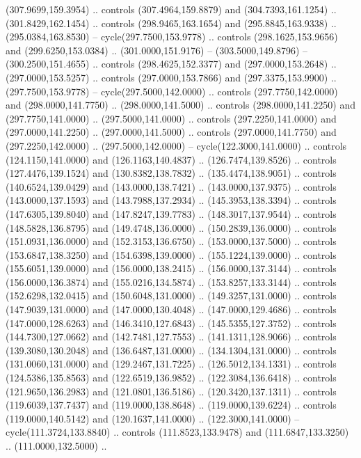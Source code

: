   (307.9699,159.3954) .. controls (307.4964,159.8879) and (304.7393,161.1254) ..
  (301.8429,162.1454) .. controls (298.9465,163.1654) and (295.8845,163.9338) ..
  (295.0384,163.8530) -- cycle(297.7500,153.9778) .. controls
  (298.1625,153.9656) and (299.6250,153.0384) .. (301.0000,151.9176) --
  (303.5000,149.8796) -- (300.2500,151.4655) .. controls (298.4625,152.3377) and
  (297.0000,153.2648) .. (297.0000,153.5257) .. controls (297.0000,153.7866) and
  (297.3375,153.9900) .. (297.7500,153.9778) -- cycle(297.5000,142.0000) ..
  controls (297.7750,142.0000) and (298.0000,141.7750) .. (298.0000,141.5000) ..
  controls (298.0000,141.2250) and (297.7750,141.0000) .. (297.5000,141.0000) ..
  controls (297.2250,141.0000) and (297.0000,141.2250) .. (297.0000,141.5000) ..
  controls (297.0000,141.7750) and (297.2250,142.0000) .. (297.5000,142.0000) --
  cycle(122.3000,141.0000) .. controls (124.1150,141.0000) and
  (126.1163,140.4837) .. (126.7474,139.8526) .. controls (127.4476,139.1524) and
  (130.8382,138.7832) .. (135.4474,138.9051) .. controls (140.6524,139.0429) and
  (143.0000,138.7421) .. (143.0000,137.9375) .. controls (143.0000,137.1593) and
  (143.7988,137.2934) .. (145.3953,138.3394) .. controls (147.6305,139.8040) and
  (147.8247,139.7783) .. (148.3017,137.9544) .. controls (148.5828,136.8795) and
  (149.4748,136.0000) .. (150.2839,136.0000) .. controls (151.0931,136.0000) and
  (152.3153,136.6750) .. (153.0000,137.5000) .. controls (153.6847,138.3250) and
  (154.6398,139.0000) .. (155.1224,139.0000) .. controls (155.6051,139.0000) and
  (156.0000,138.2415) .. (156.0000,137.3144) .. controls (156.0000,136.3874) and
  (155.0216,134.5874) .. (153.8257,133.3144) .. controls (152.6298,132.0415) and
  (150.6048,131.0000) .. (149.3257,131.0000) .. controls (147.9039,131.0000) and
  (147.0000,130.4048) .. (147.0000,129.4686) .. controls (147.0000,128.6263) and
  (146.3410,127.6843) .. (145.5355,127.3752) .. controls (144.7300,127.0662) and
  (142.7481,127.7553) .. (141.1311,128.9066) .. controls (139.3080,130.2048) and
  (136.6487,131.0000) .. (134.1304,131.0000) .. controls (131.0060,131.0000) and
  (129.2467,131.7225) .. (126.5012,134.1331) .. controls (124.5386,135.8563) and
  (122.6519,136.9852) .. (122.3084,136.6418) .. controls (121.9650,136.2983) and
  (121.0801,136.5186) .. (120.3420,137.1311) .. controls (119.6039,137.7437) and
  (119.0000,138.8648) .. (119.0000,139.6224) .. controls (119.0000,140.5142) and
  (120.1637,141.0000) .. (122.3000,141.0000) -- cycle(111.3724,133.8840) ..
  controls (111.8523,133.9478) and (111.6847,133.3250) .. (111.0000,132.5000) ..
